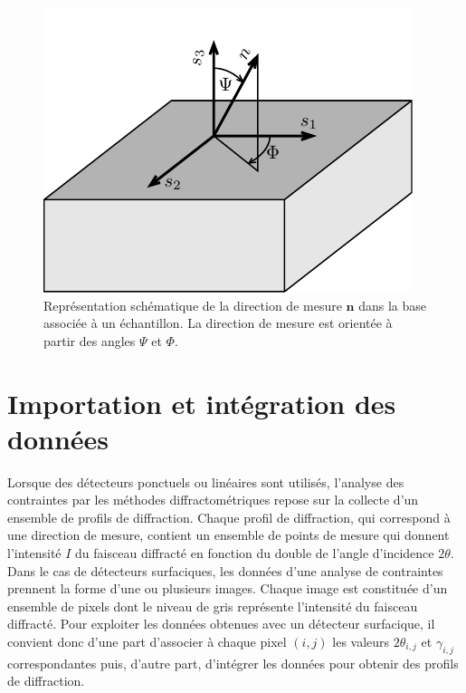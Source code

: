 \documentclass[french,a4paper]{report}
\begin{document}
\begin{figure}
\centering
\includegraphics{figures/echantillon.pdf}
\caption{Représentation schématique de la direction de mesure $\boldsymbol n$ dans la base associée à un échantillon. La direction de mesure est orientée à partir des angles $\Psi$ et $\Phi$.}
\label{fig_echantillon}
\end{figure}

\section{Importation et intégration des données}

Lorsque des détecteurs ponctuels ou linéaires sont utilisés, l'analyse des contraintes par les méthodes diffractométriques repose sur la collecte d'un ensemble de profils de diffraction. Chaque profil de diffraction, qui correspond à une direction de mesure, contient un ensemble de points de mesure qui donnent l'intensité $I$ du faisceau diffracté en fonction du double de l'angle d'incidence $2 \theta$. Dans le cas de détecteurs surfaciques, les données d'une analyse de contraintes prennent la forme d'une ou plusieurs images. Chaque image est constituée d'un ensemble de pixels dont le niveau de gris représente l'intensité du faisceau diffracté. Pour exploiter les données obtenues avec un détecteur surfacique, il convient donc d'une part d'associer à chaque pixel $(i,j)$ les valeurs $2 \theta_{i,j}$ et $\gamma_{i,j}$ correspondantes puis, d'autre part, d'intégrer les données pour obtenir des profils de diffraction.
\end{document}
